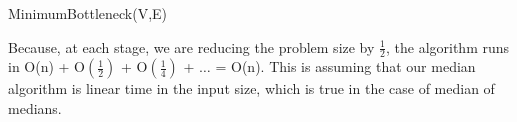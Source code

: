 \begin{enumerate}
\begin{enumerate}
\begin{framed}
\begin{algorithm}[H]
            \caption{MinimumBottleneck(V,E)}
          \end{algorithm}
        \end{framed}

        Because, at each stage, we are reducing the problem size by $\frac{1}{2}$, the algorithm runs in O(n) + O$(\frac{1}{2})$ + O$(\frac{1}{4})$ + $\ldots$ = O(n). This is assuming that our median algorithm is linear time in the input size, which is true in the case of median of medians.
    \end{enumerate}

  
\end{enumerate}

